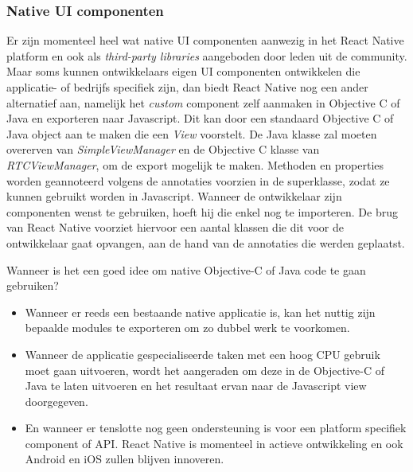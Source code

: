 	\subsubsection{Native UI componenten}
Er zijn momenteel heel wat native UI componenten aanwezig in het React Native platform en ook als \emph{third-party libraries} aangeboden door leden uit de community. Maar soms kunnen ontwikkelaars eigen UI componenten ontwikkelen die applicatie- of bedrijfs specifiek zijn, dan biedt React Native nog een ander alternatief aan, namelijk het \emph{custom} component zelf aanmaken in Objective C of Java en exporteren naar Javascript. Dit kan door een standaard Objective C of Java object aan te maken die een \emph{View} voorstelt. De Java klasse zal moeten overerven van \emph{SimpleViewManager} en de Objective C klasse van \emph{RTCViewManager}, om de export mogelijk te maken. Methoden en properties worden geannoteerd volgens de annotaties voorzien in de superklasse, zodat ze kunnen gebruikt worden in Javascript. Wanneer de ontwikkelaar zijn componenten wenst te gebruiken, hoeft hij die enkel nog te importeren. De brug van React Native voorziet hiervoor een aantal klassen die dit voor de ontwikkelaar gaat opvangen, aan de hand van de annotaties die werden geplaatst.

Wanneer is het een goed idee om native Objective-C of Java code te gaan gebruiken? 
\begin{itemize}
	\item Wanneer er reeds een bestaande native applicatie is, kan het nuttig zijn bepaalde modules te exporteren om zo dubbel werk te voorkomen.
	\item Wanneer de applicatie gespecialiseerde taken met een hoog CPU gebruik moet gaan uitvoeren, wordt het aangeraden om deze in de Objective-C of Java te laten uitvoeren en het resultaat ervan naar de Javascript view doorgegeven.
	\item En wanneer er tenslotte nog geen ondersteuning is voor een platform specifiek component of API. React Native is momenteel in actieve ontwikkeling en ook Android en iOS zullen blijven innoveren.
\end{itemize}

